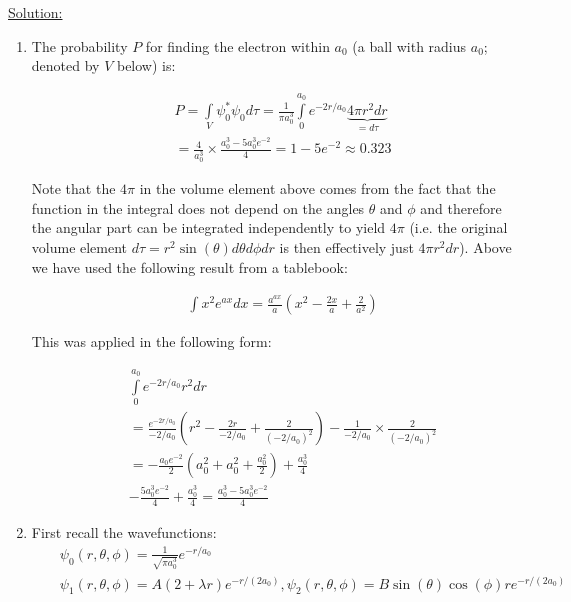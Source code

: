 \noindent
\underline{Solution:}\\

\begin{enumerate}
\item The probability $P$ for finding the electron within $a_0$ (a ball with radius $a_0$; denoted by $V$ below) is:

\begin{eqnarray}
\nonumber
& & P = \int\limits_V\psi_0^*\psi_0d\tau = \frac{1}{\pi a_0^3} \int\limits_{0}^{a_0} e^{-2r/a_0}\underbrace{4\pi r^2dr}_{= d\tau}\\
\nonumber
& & = \frac{4}{a_0^3}\times\frac{a_0^3 - 5a_0^3e^{-2}}{4} = 1 - 5e^{-2}\approx 0.323
\end{eqnarray}

Note that the $4\pi$ in the volume element above comes from the fact that the function in the integral does not depend on the angles $\theta$ and $\phi$ and therefore the angular part can be integrated independently to yield $4\pi$ (i.e. the original volume element $d\tau = r^2\sin(\theta)d\theta d\phi dr$ is then effectively just $4\pi r^2dr$). Above we have used the following result from a tablebook:

\begin{eqnarray}
& & \int x^2e^{ax}dx = \frac{a^{ax}}{a}\left(x^2 - \frac{2x}{a} + \frac{2}{a^2}\right)
\nonumber
\end{eqnarray}

This was applied in the following form:

\begin{eqnarray}
\nonumber
& & \int\limits_{0}^{a_0} e^{-2r/a_0}r^2dr\\
\nonumber
& & =\frac{e^{-2r/a_0}}{-2/a_0}\left(r^2 - \frac{2r}{-2/a_0} + \frac{2}{(-2/a_0)^2}\right) - \frac{1}{-2/a_0}\times \frac{2}{(-2/a_0)^2}\\
\nonumber
& & = -\frac{a_0 e^{-2}}{2}\left(a_0^2 + a_0^2 + \frac{a_0^2}{2}\right) + \frac{a_0^3}{4}\\
\nonumber
& & -\frac{5a_0^3e^{-2}}{4} + \frac{a_0^3}{4} = \frac{a_0^3 - 5a_0^3e^{-2}}{4}
\end{eqnarray}

\item First recall the wavefunctions:
\begin{eqnarray}
\nonumber
& & \psi_0(r,\theta,\phi) = \frac{1}{\sqrt{\pi a_0^3}}e^{-r/a_0}\\
\nonumber
& & \psi_1(r,\theta,\phi) = A(2 + \lambda r)e^{-r/(2a_0)}, \psi_2(r,\theta,\phi) = B\sin(\theta)\cos(\phi)re^{-r/(2a_0)}
\end{eqnarray}


\end{enumerate}
